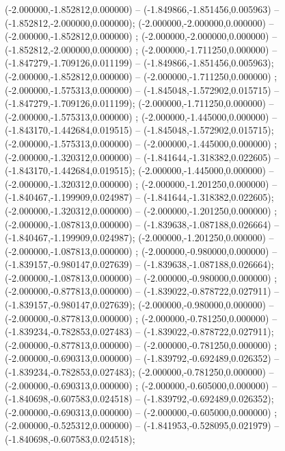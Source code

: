  (-2.000000,-1.852812,0.000000) -- (-1.849866,-1.851456,0.005963) -- (-1.852812,-2.000000,0.000000);
 (-2.000000,-2.000000,0.000000) -- (-2.000000,-1.852812,0.000000) ;
 (-2.000000,-2.000000,0.000000) -- (-1.852812,-2.000000,0.000000) ;
 (-2.000000,-1.711250,0.000000) -- (-1.847279,-1.709126,0.011199) -- (-1.849866,-1.851456,0.005963);
 (-2.000000,-1.852812,0.000000) -- (-2.000000,-1.711250,0.000000) ;
 (-2.000000,-1.575313,0.000000) -- (-1.845048,-1.572902,0.015715) -- (-1.847279,-1.709126,0.011199);
 (-2.000000,-1.711250,0.000000) -- (-2.000000,-1.575313,0.000000) ;
 (-2.000000,-1.445000,0.000000) -- (-1.843170,-1.442684,0.019515) -- (-1.845048,-1.572902,0.015715);
 (-2.000000,-1.575313,0.000000) -- (-2.000000,-1.445000,0.000000) ;
 (-2.000000,-1.320312,0.000000) -- (-1.841644,-1.318382,0.022605) -- (-1.843170,-1.442684,0.019515);
 (-2.000000,-1.445000,0.000000) -- (-2.000000,-1.320312,0.000000) ;
 (-2.000000,-1.201250,0.000000) -- (-1.840467,-1.199909,0.024987) -- (-1.841644,-1.318382,0.022605);
 (-2.000000,-1.320312,0.000000) -- (-2.000000,-1.201250,0.000000) ;
 (-2.000000,-1.087813,0.000000) -- (-1.839638,-1.087188,0.026664) -- (-1.840467,-1.199909,0.024987);
 (-2.000000,-1.201250,0.000000) -- (-2.000000,-1.087813,0.000000) ;
 (-2.000000,-0.980000,0.000000) -- (-1.839157,-0.980147,0.027639) -- (-1.839638,-1.087188,0.026664);
 (-2.000000,-1.087813,0.000000) -- (-2.000000,-0.980000,0.000000) ;
 (-2.000000,-0.877813,0.000000) -- (-1.839022,-0.878722,0.027911) -- (-1.839157,-0.980147,0.027639);
 (-2.000000,-0.980000,0.000000) -- (-2.000000,-0.877813,0.000000) ;
 (-2.000000,-0.781250,0.000000) -- (-1.839234,-0.782853,0.027483) -- (-1.839022,-0.878722,0.027911);
 (-2.000000,-0.877813,0.000000) -- (-2.000000,-0.781250,0.000000) ;
 (-2.000000,-0.690313,0.000000) -- (-1.839792,-0.692489,0.026352) -- (-1.839234,-0.782853,0.027483);
 (-2.000000,-0.781250,0.000000) -- (-2.000000,-0.690313,0.000000) ;
 (-2.000000,-0.605000,0.000000) -- (-1.840698,-0.607583,0.024518) -- (-1.839792,-0.692489,0.026352);
 (-2.000000,-0.690313,0.000000) -- (-2.000000,-0.605000,0.000000) ;
 (-2.000000,-0.525312,0.000000) -- (-1.841953,-0.528095,0.021979) -- (-1.840698,-0.607583,0.024518);

